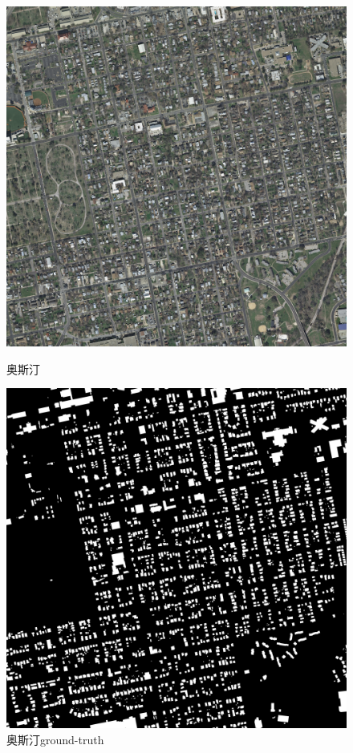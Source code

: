 \begin{figure}[htbp]
    \centering
    \begin{minipage}[t]{0.49\linewidth}
        \centering
        \includegraphics[width=1\linewidth]{Figures/结果/austin29.png}
        \caption{奥斯汀}
        \label{Fig:test_image_2}
    \end{minipage}
    \begin{minipage}[t]{0.49\linewidth}
        \centering
        \includegraphics[width=1\linewidth]{Figures/结果/austin29_gt.png}
        \caption{奥斯汀ground-truth}
        \label{Fig:test_image_2_gt}
    \end{minipage}
    
\end{figure}

